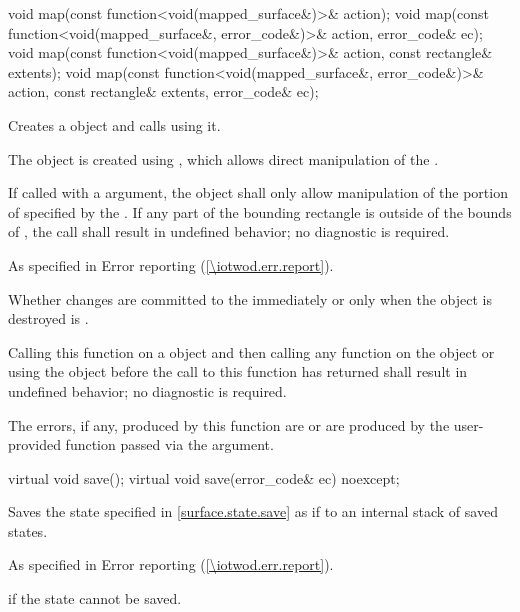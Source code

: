 \begin{itemdecl}
void map(const function<void(mapped_surface&)>& action);
void map(const function<void(mapped_surface&, error_code&)>& action, error_code& ec);
void map(const function<void(mapped_surface&)>& action, const rectangle& extents);
void map(const function<void(mapped_surface&, error_code&)>& action,
  const rectangle& extents, error_code& ec);
\end{itemdecl}
\begin{itemdescr}
\pnum
\effects
Creates a  object and calls  using it.

\pnum
The  object is created using , which allows direct manipulation of the \underlyingsurface.

\pnum
If called with a  argument, the  object shall only allow manipulation of the portion of  specified by the  . If any part of the bounding rectangle is outside of the bounds of , the call shall result in undefined behavior; no diagnostic is required.

\pnum
\throws
As specified in Error reporting (\ref{\iotwod.err.report}).

\pnum
\remarks
Whether changes are committed to the \underlyingsurface immediately or only when the  object is destroyed is \unspecnorm.

\pnum
Calling this function on a  object and then calling any function on the  object or using the  object before the call to this function has returned shall result in undefined behavior; no diagnostic is required.

\pnum
\errors
The errors, if any, produced by this function are  or are produced by the user-provided function passed via the  argument.
\end{itemdescr}

\begin{itemdecl}
virtual void save();
virtual void save(error_code& ec) noexcept;
\end{itemdecl}
\begin{itemdescr}
\pnum
\effects
Saves the state specified in \ref{surface.state.save} as if to an internal stack of saved states.

\pnum
\throws
As specified in Error reporting (\ref{\iotwod.err.report}).

\pnum
\errors
{} if the state cannot be saved.
\end{itemdescr}

